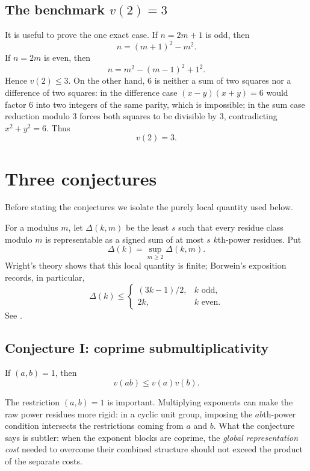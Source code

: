 \documentclass[../Axiomathic.tex]{subfiles}
\begin{document}
\subsection{The benchmark $v(2)=3$}

It is useful to prove the one exact case.  If $n=2m+1$ is odd, then
\[
  n=(m+1)^2-m^2.
\]
If $n=2m$ is even, then
\[
  n=m^2-(m-1)^2+1^2.
\]
Hence $v(2)\le3$.  On the other hand, $6$ is neither a sum of two squares nor a difference of two squares: in the difference case $(x-y)(x+y)=6$ would factor $6$ into two integers of the same parity, which is impossible; in the sum case reduction modulo $3$ forces both squares to be divisible by $3$, contradicting $x^2+y^2=6$.  Thus
\[
  \boxed{v(2)=3.}
\]


\section{Three conjectures}

Before stating the conjectures we isolate the purely local quantity used below.

\begin{defn}
For a modulus $m$, let $\Delta(k,m)$ be the least $s$ such that every residue class modulo $m$ is representable as a signed sum of at most $s$ $k$th-power residues.  Put
\[
  \Delta(k)=\sup_{m\ge2}\Delta(k,m).
\]
Wright's theory shows that this local quantity is finite; Borwein's exposition records, in particular,
\[
  \Delta(k)\le
  \begin{cases}
    (3k-1)/2,&k\text{ odd},\\
    2k,&k\text{ even}.
  \end{cases}
\]
See \cite[Sec.~4.1]{Borwein2002}.
\end{defn}

\subsection{Conjecture I: coprime submultiplicativity}

\begin{conj}\label{conj:coprime}
If $(a,b)=1$, then
\begin{equation}\label{eq:coprime-submult}
  \boxed{v(ab)\le v(a)v(b).}
\end{equation}
\end{conj}

The restriction $(a,b)=1$ is important.  Multiplying exponents can make the raw power residues more rigid: in a cyclic unit group, imposing the $ab$th-power condition intersects the restrictions coming from $a$ and $b$.  What the conjecture says is subtler: when the exponent blocks are coprime, the \emph{global representation cost} needed to overcome their combined structure should not exceed the product of the separate costs.
\end{document}
